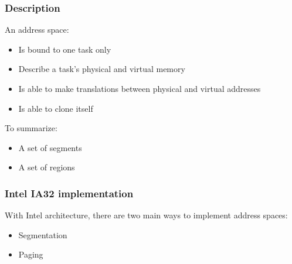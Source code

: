 \begin{frame}
  \frametitle{Description}

  An address space:

  \nl

  \begin{itemize}
  \item Is bound to one task only
  \item Describe a task's physical and virtual memory
  \item Is able to make translations between physical and virtual addresses
  \item Is able to clone itself
  \end{itemize}

  \nl

  To summarize:

  \nl

  \begin{itemize}
  \item A set of segments
  \item A set of regions
  \end{itemize}

\end{frame}


\begin{frame}
  \frametitle{Intel IA32 implementation}

  With Intel architecture, there are two main ways to implement address spaces:

  \nl

  \begin{itemize}
  \item Segmentation
  \item Paging
  \end{itemize}

\end{frame}


